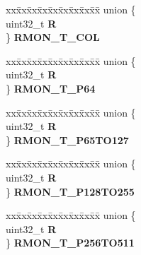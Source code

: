 \begin{DoxyCompactItemize}
\begin{tabbing}
\end{tabbing}\item 
\mbox{\label{structFEC__tag_a34bd53d34ede2fcb8294d90fa432cc74}} 
\begin{tabbing}
xx\=xx\=xx\=xx\=xx\=xx\=xx\=xx\=xx\=\kill
union \{\\
\>uint32\_t {\bfseries R}\\
\} {\bfseries RMON\_T\_COL}\\

\end{tabbing}\item 
\mbox{\label{structFEC__tag_a97c33e66ae88651e100e5db54ff49abb}} 
\begin{tabbing}
xx\=xx\=xx\=xx\=xx\=xx\=xx\=xx\=xx\=\kill
union \{\\
\>uint32\_t {\bfseries R}\\
\} {\bfseries RMON\_T\_P64}\\

\end{tabbing}\item 
\mbox{\label{structFEC__tag_ae4f94b5884dd068ad0ae53654aaed5fc}} 
\begin{tabbing}
xx\=xx\=xx\=xx\=xx\=xx\=xx\=xx\=xx\=\kill
union \{\\
\>uint32\_t {\bfseries R}\\
\} {\bfseries RMON\_T\_P65TO127}\\

\end{tabbing}\item 
\mbox{\label{structFEC__tag_a424b3e2508bbafc87d42b2f461f20825}} 
\begin{tabbing}
xx\=xx\=xx\=xx\=xx\=xx\=xx\=xx\=xx\=\kill
union \{\\
\>uint32\_t {\bfseries R}\\
\} {\bfseries RMON\_T\_P128TO255}\\

\end{tabbing}\item 
\mbox{\label{structFEC__tag_a248ac2c333bac61a6283502a4962e841}} 
\begin{tabbing}
xx\=xx\=xx\=xx\=xx\=xx\=xx\=xx\=xx\=\kill
union \{\\
\>uint32\_t {\bfseries R}\\
\} {\bfseries RMON\_T\_P256TO511}\\


\end{tabbing}
\end{DoxyCompactItemize}
